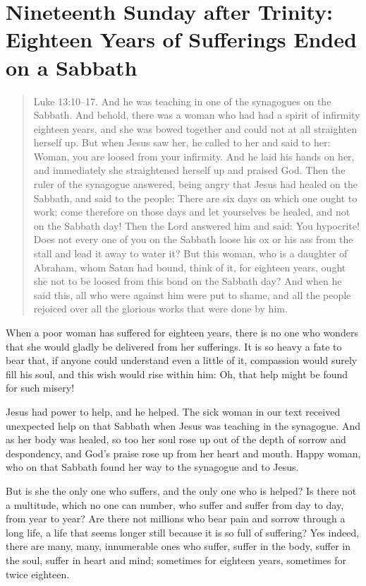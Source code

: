 
\section{Nineteenth Sunday after Trinity: Eighteen Years of Sufferings Ended on a Sabbath}

\begin{quote}

Luke 13:10–17. And he was teaching in one of the synagogues on the Sabbath. And behold, there was a woman who had had a spirit of infirmity eighteen years, and she was bowed together and could not at all straighten herself up. But when Jesus saw her, he called to her and said to her: Woman, you are loosed from your infirmity. And he laid his hands on her, and immediately she straightened herself up and praised God. Then the ruler of the synagogue answered, being angry that Jesus had healed on the Sabbath, and said to the people: There are six days on which one ought to work; come therefore on those days and let yourselves be healed, and not on the Sabbath day! Then the Lord answered him and said: You hypocrite! Does not every one of you on the Sabbath loose his ox or his ass from the stall and lead it away to water it? But this woman, who is a daughter of Abraham, whom Satan had bound, think of it, for eighteen years, ought she not to be loosed from this bond on the Sabbath day? And when he said this, all who were against him were put to shame, and all the people rejoiced over all the glorious works that were done by him.

\end{quote}

\bigskip

When a poor woman has suffered for eighteen years, there is no one who wonders that she would gladly be delivered from her sufferings. It is so heavy a fate to bear that, if anyone could understand even a little of it, compassion would surely fill his soul, and this wish would rise within him: Oh, that help might be found for such misery!

Jesus had power to help, and he helped. The sick woman in our text received unexpected help on that Sabbath when Jesus was teaching in the synagogue. And as her body was healed, so too her soul rose up out of the depth of sorrow and despondency, and God’s praise rose up from her heart and mouth. Happy woman, who on that Sabbath found her way to the synagogue and to Jesus.

But is she the only one who suffers, and the only one who is helped? Is there not a multitude, which no one can number, who suffer and suffer from day to day, from year to year? Are there not millions who bear pain and sorrow through a long life, a life that seems longer still because it is so full of suffering? Yes indeed, there are many, many, innumerable ones who suffer, suffer in the body, suffer in the soul, suffer in heart and mind; sometimes for eighteen years, sometimes for twice eighteen.

